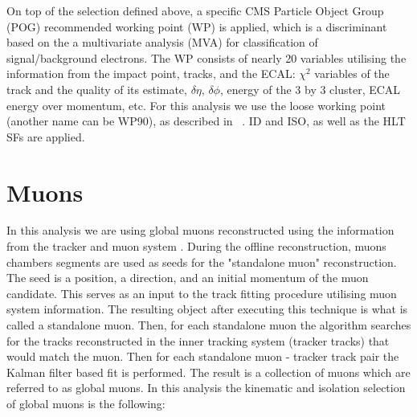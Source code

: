 
        On top of the selection defined above, a specific CMS Particle Object Group (POG) recommended working point (WP) is applied, which is a discriminant based on the a multivariate analysis (MVA) for classification of signal/background electrons. The WP consists of nearly 20 variables utilising the information from the impact point, tracks, and the ECAL: $\chi^2$ variables of the track and the quality of its estimate, $\delta \eta$, $\delta \phi$, energy of the 3 by 3 cluster, ECAL energy over momentum, etc. For this analysis we use the loose working point (another name can be WP90), as described in ~\cite{vhbbAN}. ID and ISO, as well as the HLT SFs are applied.



\section{Muons\label{sec:muons}}
        In this analysis we are using global muons reconstructed using the information from the tracker and muon system \cite{CMS-PAS-MUO-10-002,Chatrchyan:2012xi}. During the offline reconstruction, muons chambers segments are used as seeds for the "standalone muon" reconstruction. The seed is a position, a direction, and an initial momentum of the muon candidate. This serves as an input to the track fitting procedure utilising muon system information. The resulting object after executing this technique is what is called a standalone muon. Then, for each standalone muon the algorithm searches for the tracks reconstructed in the inner tracking system (tracker tracks) that would match the muon. Then for each standalone muon - tracker track pair the Kalman filter based fit \cite{Lenzi:2013xpa} is performed. The result is a collection of muons which are referred to as global muons. In this analysis the kinematic and isolation selection of global muons is the following:
        
